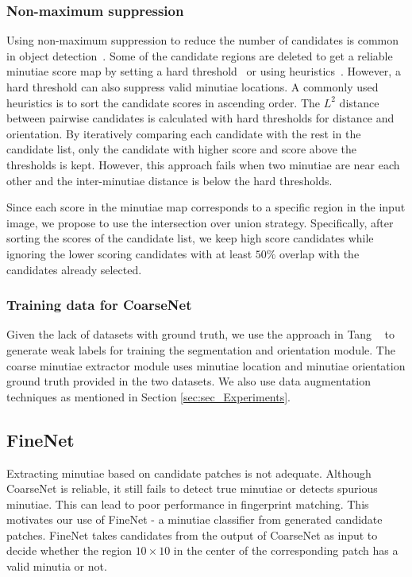 \documentclass[10pt,twocolumn,letterpaper]{article}
\begin{document}
\subsubsection{Non-maximum suppression}
\label{sec:sec_NMS}
Using non-maximum suppression to reduce the number of candidates is common in object detection~\cite{girshick2015deformable, ren2017faster}. Some of the candidate regions are deleted to get a reliable minutiae score map by setting a hard threshold~\cite{Darlow2017DeepLearn} or using heuristics~\cite{tang2017CNN, tang2017FingerNet}. However, a hard threshold can also suppress valid minutiae locations. A commonly used  heuristics is to sort the candidate scores in ascending order. The $L^2$ distance between pairwise candidates is calculated with hard thresholds for distance and orientation. By iteratively comparing each candidate with the rest in the candidate list, only the candidate with higher score and score above the thresholds is kept. However, this approach fails when two minutiae are near each other and the inter-minutiae distance is below the hard thresholds.

Since each score in the minutiae map corresponds to a specific region in the input image, we propose to use the intersection over union strategy. Specifically, after sorting the scores of the candidate list, we keep high score candidates while ignoring the lower scoring candidates with at least $50\%$ overlap with the candidates already selected.
\vspace{-4mm}
\subsubsection{Training data for CoarseNet}
\label{sec:lack_data}
Given the lack of datasets with ground truth, we use the approach in Tang \etal~\cite{tang2017FingerNet} to generate weak labels for training the segmentation and orientation module. The coarse minutiae extractor module uses minutiae location and minutiae orientation ground truth provided in the two datasets. We also use data augmentation techniques as mentioned in Section \ref{sec:sec_Experiments}.

\subsection{FineNet}
\label{sec:sec_FineNet}
Extracting minutiae based on candidate patches is not adequate. Although CoarseNet is reliable, it still fails to detect true minutiae or detects spurious minutiae. This can lead to poor performance in fingerprint matching. This motivates our use of FineNet - a minutiae classifier from generated candidate patches. FineNet takes candidates from the output of CoarseNet as input to decide whether the region $10 \times 10$ in the center of the corresponding patch has a valid minutia or not.
\vspace{-4mm}
\end{document}
